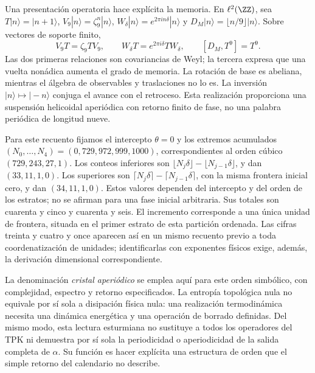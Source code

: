 Una presentación operatoria hace explícita la memoria. En \(\ell^2(\ZZ)\), sea \(T|n\rangle=|n+1\rangle\), \(V_9|n\rangle=\zeta_9^n|n\rangle\), \(W_\delta|n\rangle=e^{2\pi i n\delta}|n\rangle\) y \(D_M|n\rangle=\lfloor n/9\rfloor|n\rangle\). Sobre vectores de soporte finito,
\begin{equation}
 V_9T=\zeta_9TV_9,\qquad
 W_\delta T=e^{2\pi i\delta}TW_\delta,\qquad
 [D_M,T^9]=T^9.
 \label{eq:weyl-relojes}
\end{equation}
Las dos primeras relaciones son covariancias de Weyl; la tercera expresa que una vuelta nonádica aumenta el grado de memoria. La rotación de base es abeliana, mientras el álgebra de observables y traslaciones no lo es. La inversión \(|n\rangle\mapsto|-n\rangle\) conjuga el avance con el retroceso. Esta realización proporciona una suspensión helicoidal aperiódica con retorno finito de fase, no una palabra periódica de longitud nueve.



Para este recuento fijamos el intercepto \(\theta=0\) y los extremos acumulados \((N_0,\ldots,N_4)=(0,729,972,999,1000)\), correspondientes al orden cúbico \((729,243,27,1)\). Los conteos inferiores son \(\lfloor N_j\delta\rfloor-\lfloor N_{j-1}\delta\rfloor\), y dan \((33,11,1,0)\). Los superiores son \(\lceil N_j\delta\rceil-\lceil N_{j-1}\delta\rceil\), con la misma frontera inicial cero, y dan \((34,11,1,0)\). Estos valores dependen del intercepto y del orden de los estratos; no se afirman para una fase inicial arbitraria. Sus totales son cuarenta y cinco y cuarenta y seis. El incremento corresponde a una única unidad de frontera, situada en el primer estrato de esta partición ordenada. Las cifras treinta y cuatro y once aparecen así en un mismo recuento previo a toda coordenatización de unidades; identificarlas con exponentes físicos exige, además, la derivación dimensional correspondiente.

La denominación \emph{cristal aperiódico} se emplea aquí para este orden simbólico, con complejidad, espectro y retorno especificados. La entropía topológica nula no equivale por sí sola a disipación física nula: una realización termodinámica necesita una dinámica energética y una operación de borrado definidas. Del mismo modo, esta lectura esturmiana no sustituye a todos los operadores del TPK ni demuestra por sí sola la periodicidad o aperiodicidad de la salida completa de \(\alpha\). Su función es hacer explícita una estructura de orden que el simple retorno del calendario no describe.




